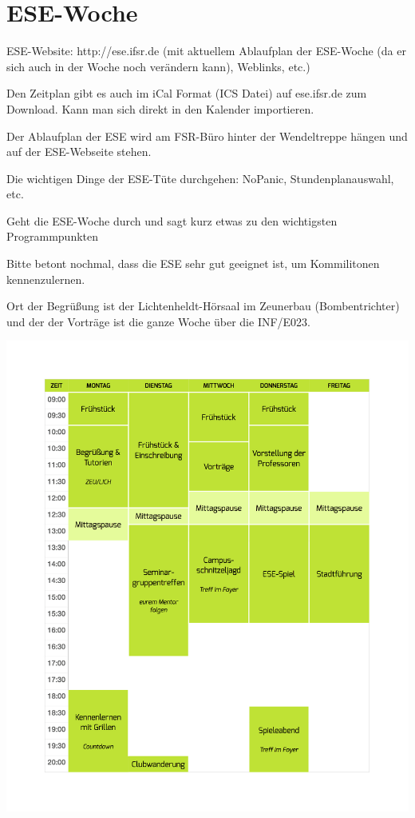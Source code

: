 \documentclass[a4paper,12pt]{report}
\begin{document}
\section{ESE-Woche}
\begin{itemize*}
\item ESE-Website: http://ese.ifsr.de (mit aktuellem Ablaufplan der ESE-Woche (da er sich auch in der Woche noch verändern kann), Weblinks, etc.)
\item Den Zeitplan gibt es auch im iCal Format (ICS Datei) auf ese.ifsr.de zum Download. Kann man sich direkt in den Kalender importieren.
\item Der Ablaufplan der ESE wird am FSR-Büro hinter der Wendeltreppe hängen und auf der ESE-Webseite stehen.
\item Die wichtigen Dinge der ESE-Tüte durchgehen: NoPanic, Stundenplanauswahl, etc.
\item Geht die ESE-Woche durch und sagt kurz etwas zu den wichtigsten Programmpunkten
\item Bitte betont nochmal, dass die ESE sehr gut geeignet ist, um Kommilitonen kennenzulernen.
\end{itemize*}
\vspace{0.5cm}
Ort der Begrüßung ist der Lichtenheldt-Hörsaal im Zeunerbau (Bombentrichter) und der der Vorträge ist die ganze Woche über die INF/E023.

\includegraphics[width=\linewidth]{./zeitplan.png}
\end{document}
